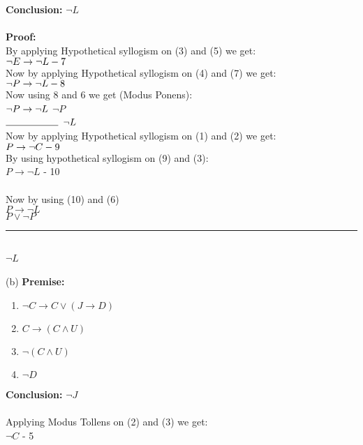 \documentclass{article}
\begin{document}
\textbf{Conclusion:}
$ \neg L $ \\ 
\\
\textbf{Proof:} \\
By applying Hypothetical syllogism on (3) and (5) we get: \\
$\neg E \rightarrow \neg L       - 7 \\$
\\
Now by applying Hypothetical syllogism on (4) and (7) we get: \\ 
$\neg P \rightarrow \neg L      - 8 \\$
\\
Now using 8 and 6 we get (Modus Ponens): \\
$\neg P \rightarrow \neg L \\ $
$\neg P $ \\
$ \noindent\rule{1.9cm}{0.4pt}\\ $
$\neg L  \\ $
\\
Now by applying Hypothetical syllogism on (1) and (2) we get: \\
$ P \rightarrow \neg C - 9 \\ $
\\
By using hypothetical syllogism on (9) and (3): \\
$ P \rightarrow \neg L $ - 10 \\
\\
Now by using (10) and (6) \\
$ P \rightarrow \neg L $ \\
$P \vee \neg P$ \\
\noindent\rule{1.9cm}{0.4pt}\\
$ \neg L$ \\
\\
(b) \textbf{Premise:} 
\begin{enumerate}
    \item $\neg C \rightarrow C \vee (J \rightarrow D)$
    \item $C \rightarrow (C \wedge U)$
    \item $ \neg (C \wedge U)$
    \item $\neg D$ \\
    \end{enumerate}
\textbf{Conclusion:}
$ \neg J $ \\
\\
Applying Modus Tollens on (2) and (3) we get: \\
$ \neg C $ - 5 \\
\\
\end{document}
